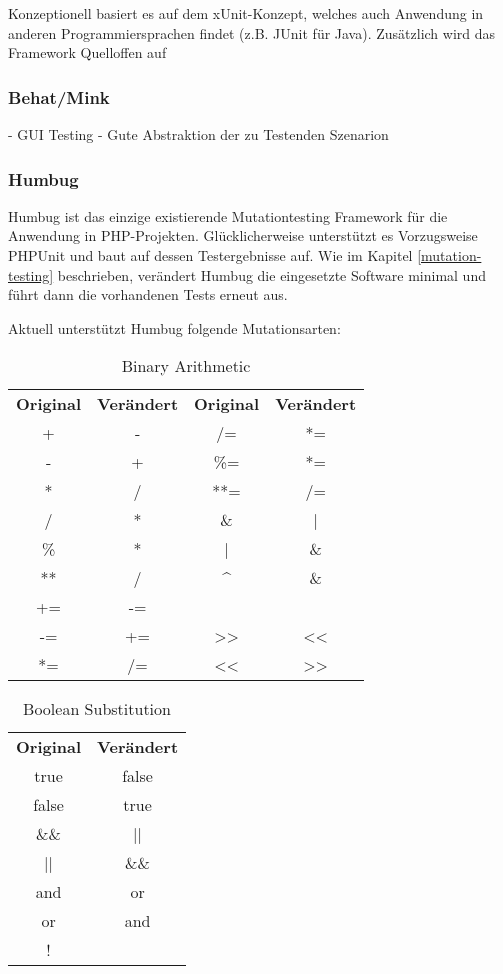 Konzeptionell basiert es auf dem xUnit-Konzept, welches auch Anwendung in anderen Programmiersprachen findet (z.B. JUnit für Java). Zusätzlich wird das Framework Quelloffen auf 

\subsubsection{Behat/Mink}
- GUI Testing
- Gute Abstraktion der zu Testenden Szenarion


\subsubsection{Humbug}
Humbug ist das einzige existierende Mutationtesting Framework für die Anwendung in PHP-Projekten. Glücklicherweise unterstützt es Vorzugsweise PHPUnit und baut auf dessen Testergebnisse auf. Wie im Kapitel \ref*{mutation-testing} beschrieben, verändert Humbug die eingesetzte Software minimal und führt dann die vorhandenen Tests erneut aus. 

Aktuell unterstützt Humbug folgende Mutationsarten:
\begin{table}[H]
 	 \caption{Binary Arithmetic}
 \begin{tabular}{cccc}
 	\textbf{Original} & \textbf{Verändert} & \textbf{Original} & \textbf{Verändert} \\
 	+ & - & /= & *= \\
 	- & + & \%= & *= \\
 	* & / & **= & /= \\
 	/ & * & \& & | \\
 	\% & * & | & \& \\
 	** & / & \textasciicircum & \& \\
 	+= & -= & ~ &  \\
 	-= & += & >> & << \\ 	 	 	 	 	 	
 	*= & /= & << & >> \\ 	 	 	 	 	 	
 \end{tabular}
\end{table}


\begin{table}[h]
	\caption{Boolean Substitution}
	\begin{tabular}{cc}
		\textbf{Original} & \textbf{Verändert} \\
		true & false \\
		false & true \\
		\&\& & || \\
		|| & \&\& \\
		and & or \\
		or & and \\
		! & \\
	\end{tabular}
\end{table}

